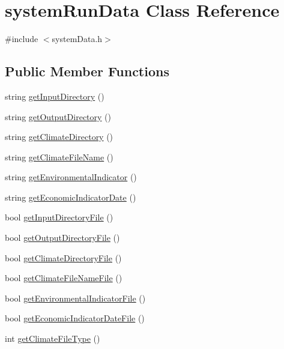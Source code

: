 \hypertarget{classsystem_run_data}{
\section{systemRunData Class Reference}
\label{classsystem_run_data}
}


{\ttfamily \#include $<$systemData.h$>$}\subsection*{Public Member Functions}
\begin{DoxyCompactItemize}
\item 
string \hyperlink{classsystem_run_data_a12cc74ebc9cc10b47b1d9d9dba0cdb5d}{getInputDirectory} ()
\item 
string \hyperlink{classsystem_run_data_abdcf9e1a1dba1bc4ba5ae67d3273f4ec}{getOutputDirectory} ()
\item 
string \hyperlink{classsystem_run_data_af95e19217f65a5d6898f70de5f709653}{getClimateDirectory} ()
\item 
string \hyperlink{classsystem_run_data_aaf7c8e933c94e9687eb04933438622dc}{getClimateFileName} ()
\item 
string \hyperlink{classsystem_run_data_a70d458bd81cbd4599b709a07fe6f335d}{getEnvironmentalIndicator} ()
\item 
string \hyperlink{classsystem_run_data_a7f247783cb2cab26e4fdf9e73c76ee34}{getEconomicIndicatorDate} ()
\item 
bool \hyperlink{classsystem_run_data_a3f165443d8a872c752a11631a925fd82}{getInputDirectoryFile} ()
\item 
bool \hyperlink{classsystem_run_data_ae107a1c4a21846cd4572d2c3090af44d}{getOutputDirectoryFile} ()
\item 
bool \hyperlink{classsystem_run_data_ae07198ce2e31dbb87eb39e51daea4550}{getClimateDirectoryFile} ()
\item 
bool \hyperlink{classsystem_run_data_af2a7eb2ed96d52c61752fe439af7c216}{getClimateFileNameFile} ()
\item 
bool \hyperlink{classsystem_run_data_a814fe7298f8914150ce084df234e400d}{getEnvironmentalIndicatorFile} ()
\item 
bool \hyperlink{classsystem_run_data_a1d795cca46c0fab4f4beb812878bfa4f}{getEconomicIndicatorDateFile} ()
\item 
int \hyperlink{classsystem_run_data_ad566f378ef25571f56a43af53d1cf442}{getClimateFileType} ()
\item 

\end{DoxyCompactItemize}
